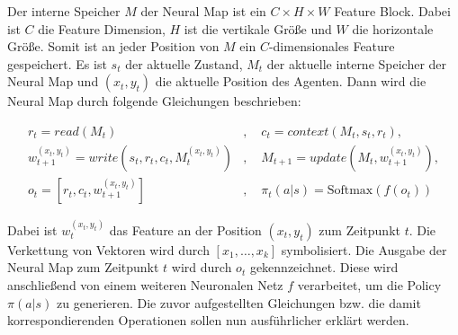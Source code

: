 Der interne Speicher $M$ der Neural Map ist ein $C \times H \times W$ Feature Block. Dabei ist $C$ die Feature Dimension, $H$ ist die vertikale Größe und $W$ die horizontale Größe. Somit ist an jeder Position von $M$ ein $C$-dimensionales Feature gespeichert. Es ist $s_t$ der aktuelle Zustand, $M_t$ der aktuelle interne Speicher der Neural Map und $(x_t,y_t)$ die aktuelle Position des Agenten. Dann wird die Neural Map durch folgende Gleichungen beschrieben:

\begin{equation*}
  \begin{align*}
    r_t=read(M_t)&, \quad c_t=context(M_t, s_t, r_t), \\
    w_{t+1}^{(x_t,y_t)}=write(s_t, r_t, c_t, M_t^{(x_t,y_t)})&, \quad M_{t+1}=update(M_t, w_{t+1}^{(x_t,y_t)}), \\
    o_t=[r_t, c_t, w_{t+1}^{(x_t,y_t)}]&, \quad \pi_t(a|s)=\text{Softmax}(f(o_t))
  \end{align*}
\end{equation*}

Dabei ist $w_t^{(x_t,y_t)}$ das Feature an der Position $(x_t,y_t)$ zum Zeitpunkt $t$. Die Verkettung von Vektoren wird durch $[x_1, \dots, x_k]$ symbolisiert. Die Ausgabe der Neural Map zum Zeitpunkt $t$ wird durch $o_t$ gekennzeichnet. Diese wird anschließend von einem weiteren Neuronalen Netz $f$ verarbeitet, um die Policy $\pi(a|s)$ zu generieren. Die zuvor aufgestellten Gleichungen bzw. die damit korrespondierenden Operationen sollen nun ausführlicher erklärt werden.


